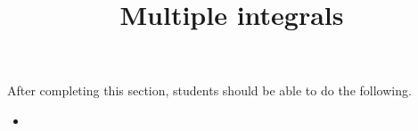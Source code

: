 \documentclass{ximera}
\title{Multiple integrals}
\begin{document}
\begin{abstract}
\end{abstract}
\maketitle

\begin{sectionOutcomes}

After completing this section, students should be able to do the following.

\begin{itemize}
\item 
\end{itemize}

\end{sectionOutcomes}
\end{document}
